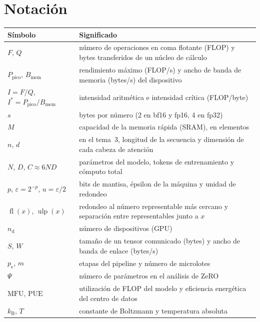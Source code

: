 \documentclass[11pt,a4paper,twoside,openany]{book}
\newcommand{\Ppico}{P_{\mathrm{pico}}}
\newcommand{\Bmem}{B_{\mathrm{mem}}}
\newcommand{\Icrit}{I^{\ast}}
\newcommand{\fl}{\operatorname{fl}}
\newcommand{\ulp}{\operatorname{ulp}}
\newcommand{\MFU}{\mathrm{MFU}}
\newcommand{\PUE}{\mathrm{PUE}}
\newcommand{\kB}{k_{\mathrm{B}}}
\begin{document}
\section*{Notación}
\begin{center}\small
\begin{tabularx}{\textwidth}{@{}l>{\raggedright\arraybackslash}X@{}}
\toprule
Símbolo & Significado \\
\midrule
$F$, $Q$ & número de operaciones en coma flotante (FLOP) y bytes transferidos de un núcleo de cálculo \\
$\Ppico$, $\Bmem$ & rendimiento máximo (FLOP/s) y ancho de banda de memoria (bytes/s) del dispositivo \\
$I=F/Q$, $\Icrit=\Ppico/\Bmem$ & intensidad aritmética e intensidad crítica (FLOP/byte) \\
$s$ & bytes por número (2 en bf16 y fp16, 4 en fp32) \\
$M$ & capacidad de la memoria rápida (SRAM), en elementos \\
$n$, $d$ & en el tema~3, longitud de la secuencia y dimensión de cada cabeza de atención \\
$N$, $D$, $C\approx 6ND$ & parámetros del modelo, tokens de entrenamiento y cómputo total \\
$p$, $\varepsilon=2^{-p}$, $u=\varepsilon/2$ & bits de mantisa, épsilon de la máquina y unidad de redondeo \\
$\fl(x)$, $\ulp(x)$ & redondeo al número representable más cercano y separación entre representables junto a $x$ \\
$n_{\mathrm{d}}$ & número de dispositivos (GPU) \\
$S$, $W$ & tamaño de un tensor comunicado (bytes) y ancho de banda de enlace (bytes/s) \\
$p_{\mathrm{e}}$, $m$ & etapas del pipeline y número de microlotes \\
$\Psi$ & número de parámetros en el análisis de ZeRO \\
$\MFU$, $\PUE$ & utilización de FLOP del modelo y eficiencia energética del centro de datos \\
$\kB$, $T$ & constante de Boltzmann y temperatura absoluta \\
\bottomrule
\end{tabularx}
\end{center}


\tableofcontents

\mainmatter







\backmatter

\end{document}
